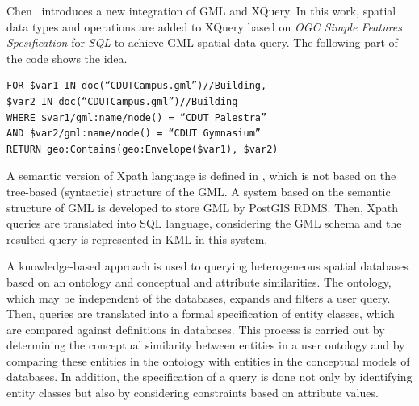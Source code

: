 \documentclass[a4paper,12pt]{article}
\begin{document}
Chen~\cite{Chen2010} introduces a new integration of GML and XQuery. In this work,
spatial data types and operations are added to XQuery based on \emph{OGC Simple
Features Spesification} for \emph{SQL} to achieve GML spatial data query.
The following part of the code shows the idea. 

\begin{verbatim}
FOR $var1 IN doc(“CDUTCampus.gml”)//Building,
$var2 IN doc(“CDUTCampus.gml”)//Building
WHERE $var1/gml:name/node() = “CDUT Palestra”
AND $var2/gml:name/node() = “CDUT Gymnasium”
RETURN geo:Contains(geo:Envelope($var1), $var2)
\end{verbatim}

A semantic version of Xpath language is defined in \cite{Alemdros2011, Alemdros2013}, 
which is not based on the tree-based (syntactic) structure of the GML.
A system based on the semantic structure of GML is developed to store GML by PostGIS RDMS.
Then, Xpath queries are translated into SQL language, considering the GML schema
and the resulted query is represented in KML \cite{kml} in this system.

\cite{Gutierrez2004} A knowledge-based approach is used to querying heterogeneous spatial databases based on an ontology and conceptual and attribute similarities. The ontology, which may be independent of the databases, expands and filters a user query. Then, queries are translated into a formal specification of entity classes, which are compared against definitions in databases. This process is carried out by determining the conceptual similarity between entities in a user ontology and by comparing these entities in the ontology with entities in the conceptual models of databases. In addition, the speciﬁcation of a query is done not only by identifying entity classes but also by considering constraints based on attribute values.
\end{document}
